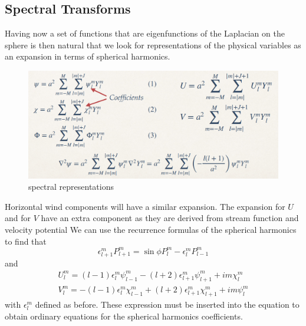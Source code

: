 \subsection{Spectral Transforms}
Having now a set of functions that are eigenfunctions of the Laplacian on the sphere is then natural that we look for representations of the physical variables as an expansion in terms of spherical harmonics.

\begin{figure}[htpb]
	\centering
	\includegraphics[width=0.5\linewidth]{uploads/Screenshot 2024-11-17 203102.png}
	\caption{spectral representations}
	\label{fig:enter-label}
\end{figure}
Horizontal wind components will have a similar expansion. The expansion for $U$ and for $V$ have an extra component as they are derived from stream function and velocity potential We can use the recurrence formulas of the spherical harmonics to find that
$$\epsilon_{l+1}^mP_{l+1}^m=\sin\phi P^m_l-\epsilon_l^mP^m_{l-1}$$
and
\begin{align*}
	U_l^m=(l-1)\epsilon_l^m\psi^m_{l-1}-(l+2)\epsilon_{l+1}^m\psi_{l+1}^m+im\chi_l^m \\
	V_l^m=-(l-1)\epsilon_l^m\chi_{l-1}^m+(l+2)\epsilon_{l+1}^m\chi_{l+1}^m+im\psi_l^m
\end{align*}
with $\epsilon_l^m$ defined as before.
These expression must be inserted into the equation to obtain ordinary equations for the spherical harmonics coefficients.





